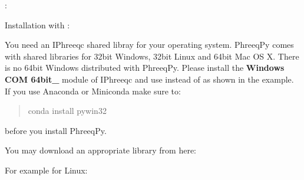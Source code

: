 \documentclass[letterpaper,10pt,english]{sphinxmanual}
\begin{document}
: 

Installation with :

\begin{sphinxVerbatim}[commandchars=\\\{\}]
   
\end{sphinxVerbatim}

You need an IPhreeqc shared libray for your operating system.
PhreeqPy comes with shared libraries for 32\sphinxhyphen{}bit Windows, 32\sphinxhyphen{}bit Linux and
64\sphinxhyphen{}bit Mac OS X.
There is no 64\sphinxhyphen{}bit Windows distributed with PhreeqPy.
Please install the {\color{red}\bfseries{}\textasciigrave{}Windows COM 64\sphinxhyphen{}bit\textasciigrave{}\_} module of IPhreeqc and use
 instead of
 as shown in the example.
If you use Anaconda or Miniconda make sure to:
\begin{quote}

conda install pywin32
\end{quote}

before you install PhreeqPy.

You may download an appropriate library from here:

For example for Linux:

\begin{sphinxVerbatim}[commandchars=\\\{\}]
 
  
 
 
  
\end{sphinxVerbatim}
\end{document}

